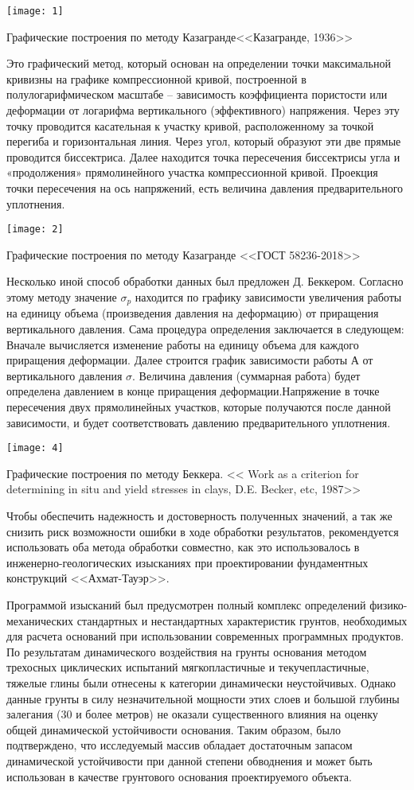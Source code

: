  \texttt{[image: 1]}
 \caption{Графические построения по методу Казагранде<<Казагранде, 1936>>}

 Это графический метод, который основан на определении точки максимальной кривизны на графике компрессионной кривой, построенной в полулогарифмическом масштабе – зависимость коэффициента пористости или деформации от логарифма вертикального (эффективного) напряжения. Через эту точку проводится касательная к участку кривой, расположенному за точкой перегиба и горизонтальная линия. Через угол, который образуют эти две прямые проводится биссектриса. Далее находится точка пересечения биссектрисы угла и «продолжения» прямолинейного участка компрессионной кривой. Проекция точки пересечения на ось напряжений, есть величина давления предварительного уплотнения. 

 \texttt{[image: 2]}
 \caption{Графические построения по методу Казагранде <<ГОСТ 58236-2018>>}
 
  
  Несколько иной способ обработки данных был предложен Д. Беккером. Согласно этому методу значение $\sigma_p$ находится по графику зависимости увеличения работы на единицу объема (произведения давления на деформацию) от приращения вертикального давления. Сама процедура определения заключается в следующем: Вначале вычисляется изменение работы на единицу объема для каждого приращения деформации. Далее строится график зависимости работы А от вертикального давления $\sigma$. Величина давления (суммарная работа)  будет определена давлением в конце приращения деформации.Напряжение в точке пересечения двух прямолинейных участков, которые получаются после данной зависимости, и будет соответствовать давлению предварительного уплотнения.

  \texttt{[image: 4]}
  \caption{Графические построения по методу Беккера. << Work as a criterion for determining in situ and yield stresses in clays, D.E. Becker, etc, 1987>>}
  
  Чтобы обеспечить надежность и достоверность полученных значений, а так же снизить риск возможности ошибки в ходе обработки результатов, рекомендуется использовать оба метода обработки совместно, как это использовалось в инженерно-геологических изысканиях при проектировании фундаментных конструкций <<Ахмат-Тауэр>>. 

  Программой изысканий был предусмотрен полный комплекс определений физико-механических стандартных и нестандартных характеристик грунтов, необходимых для расчета оснований при использовании современных программных продуктов. По результатам динамического воздействия на грунты основания методом трехосных циклических испытаний мягкопластичные и текучепластичные, тяжелые глины были отнесены к категории динамически неустойчивых. Однако данные грунты в силу незначительной мощности этих слоев и большой глубины залегания (30 и более метров) не оказали существенного влияния на оценку общей динамической устойчивости основания. Таким образом, было подтверждено, что исследуемый массив обладает достаточным запасом динамической устойчивости при данной степени обводнения и может быть использован в качестве грунтового основания проектируемого объекта.

